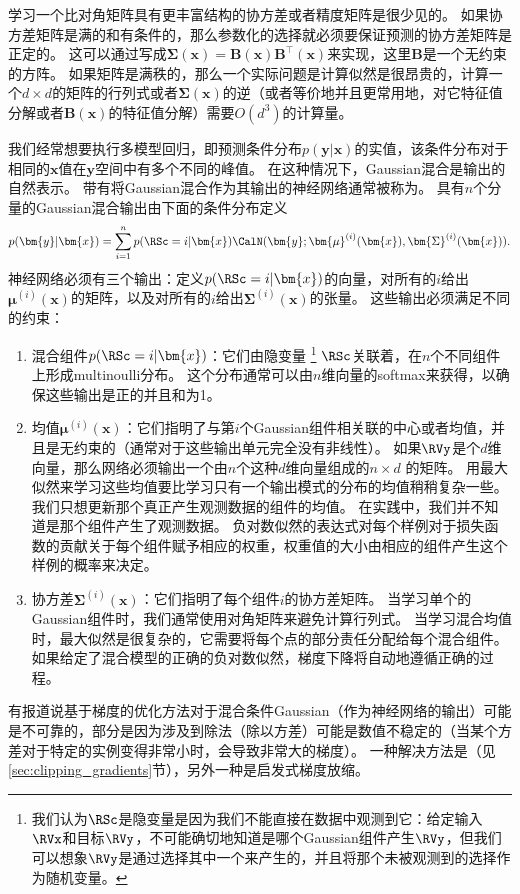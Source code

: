 
学习一个比对角矩阵具有更丰富结构的协方差或者精度矩阵是很少见的。
如果协方差矩阵是满的和有条件的，那么参数化的选择就必须要保证预测的协方差矩阵是正定的。
这可以通过写成$\bm{\Sigma}(\bm{x})=\bm{B}(\bm{x})\bm{B}^\top (\bm{x})$来实现，这里$\bm{B}$是一个无约束的方阵。
如果矩阵是满秩的，那么一个实际问题是计算似然是很昂贵的，计算一个$d\times d$的矩阵的行列式或者$\bm{\Sigma}(\bm{x})$的逆（或者等价地并且更常用地，对它特征值分解或者$\bm{B}(\bm{x})$的特征值分解）需要$O(d^3)$的计算量。


我们经常想要执行多模型回归，即预测条件分布$p(\bm{y}|\bm{x})$的实值，该条件分布对于相同的$\bm{x}$值在$\bm{y}$空间中有多个不同的峰值。
在这种情况下，Gaussian混合是输出的自然表示\citep{Jacobs-nc91,bishop1994mixture}。
带有将Gaussian混合作为其输出的神经网络通常被称为。
具有$n$个分量的Gaussian混合输出由下面的条件分布定义
\begin{equation}
p(\bm{y}|\bm{x}) = \sum_{i=1}^n p(\RSc = i | \bm{x}) \CalN(\bm{y}; \bm{\mu}^{(i)}(\bm{x}), \bm{\Sigma}^{(i)}(\bm{x})).
\end{equation}
神经网络必须有三个输出：定义$p(\RSc=i|\bm{x})$的向量，对所有的$i$给出$\bm{\mu}^{(i)}(\bm{x})$的矩阵，以及对所有的$i$给出$\bm{\Sigma}^{(i)}(\bm{x})$的张量。
这些输出必须满足不同的约束：
\begin{enumerate}
\item 混合组件$p(\RSc=i|\bm{x})$：它们由隐变量
\footnote{我们认为$\RSc$是隐变量是因为我们不能直接在数据中观测到它：给定输入$\RVx$和目标$\RVy$，不可能确切地知道是哪个Gaussian组件产生$\RVy$，但我们可以想象$\RVy$是通过选择其中一个来产生的，并且将那个未被观测到的选择作为随机变量。}
$\RSc$关联着，在$n$个不同组件上形成multinoulli分布。
这个分布通常可以由$n$维向量的softmax来获得，以确保这些输出是正的并且和为1。

\item 均值$\bm{\mu}^{(i)}(\bm{x})$：它们指明了与第$i$个Gaussian组件相关联的中心或者均值，并且是无约束的（通常对于这些输出单元完全没有非线性）。
如果$\RVy$是个$d$维向量，那么网络必须输出一个由$n$个这种$d$维向量组成的$n\times d$ 的矩阵。
用最大似然来学习这些均值要比学习只有一个输出模式的分布的均值稍稍复杂一些。我们只想更新那个真正产生观测数据的组件的均值。
在实践中，我们并不知道是那个组件产生了观测数据。
负对数似然的表达式对每个样例对于损失函数的贡献关于每个组件赋予相应的权重，权重值的大小由相应的组件产生这个样例的概率来决定。

\item 协方差$\bm{\Sigma}^{(i)}(\bm{x})$：它们指明了每个组件$i$的协方差矩阵。
当学习单个的Gaussian组件时，我们通常使用对角矩阵来避免计算行列式。
当学习混合均值时，最大似然是很复杂的，它需要将每个点的部分责任分配给每个混合组件。
如果给定了混合模型的正确的负对数似然，梯度下降将自动地遵循正确的过程。
\end{enumerate}
有报道说基于梯度的优化方法对于混合条件Gaussian（作为神经网络的输出）可能是不可靠的，部分是因为涉及到除法（除以方差）可能是数值不稳定的（当某个方差对于特定的实例变得非常小时，会导致非常大的梯度）。
一种解决方法是（见\ref{sec:clipping_gradients}节），另外一种是启发式梯度放缩\citep{Uria+al-ICML2014}。

